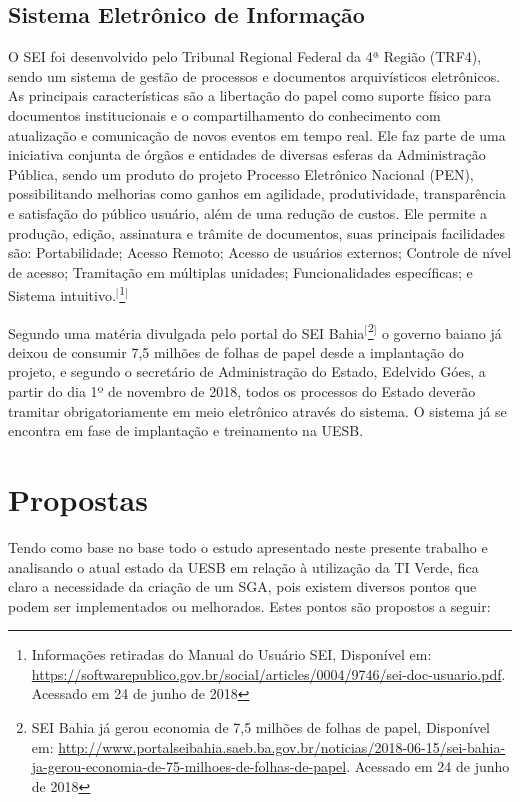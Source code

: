 \subsection{Sistema Eletrônico de Informação}

O SEI foi desenvolvido pelo Tribunal Regional Federal da 4ª Região (TRF4), sendo um sistema de gestão de processos e documentos arquivísticos eletrônicos. As principais características são a libertação do papel como suporte físico para documentos institucionais e o compartilhamento do conhecimento com atualização e comunicação de novos eventos em tempo real. Ele faz parte de uma iniciativa conjunta de órgãos e entidades de diversas esferas da Administração Pública, sendo um produto do projeto Processo Eletrônico Nacional (PEN), possibilitando melhorias como ganhos em agilidade, produtividade, transparência e satisfação do público usuário, além de uma redução de custos. Ele permite a produção, edição, assinatura e trâmite de documentos, suas principais facilidades são: Portabilidade; Acesso Remoto; Acesso de usuários externos; Controle de nível de acesso; Tramitação em múltiplas unidades; Funcionalidades específicas; e Sistema intuitivo.$^{[}$\footnote{Informações retiradas do Manual do Usuário SEI, Disponível em: \url{https://softwarepublico.gov.br/social/articles/0004/9746/sei-doc-usuario.pdf}.  Acessado em 24 de junho de 2018}$^{]}$

Segundo uma matéria divulgada pelo portal do SEI Bahia$^{[}$\footnote{SEI Bahia já gerou economia de 7,5 milhões de folhas de papel, Disponível em: \url{http://www.portalseibahia.saeb.ba.gov.br/noticias/2018-06-15/sei-bahia-ja-gerou-economia-de-75-milhoes-de-folhas-de-papel}.  Acessado em 24 de junho de 2018}$^{]}$ o governo baiano já deixou de consumir 7,5 milhões de folhas de papel desde a implantação do projeto, e segundo o secretário de Administração do Estado, Edelvido Góes, a partir do dia 1º de novembro de 2018, todos os processos do Estado deverão tramitar obrigatoriamente em meio eletrônico através do sistema. O sistema já se encontra em fase de implantação e treinamento na UESB.

\section{Propostas}

Tendo como base no base todo o estudo apresentado neste presente trabalho e analisando o atual estado da UESB em relação à utilização da TI Verde, fica claro a necessidade da criação de um SGA, pois existem diversos pontos que podem ser implementados ou melhorados. Estes pontos são propostos a seguir:

